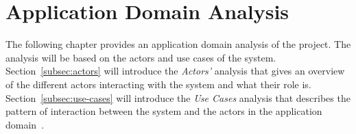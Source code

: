 \section{Application Domain Analysis}\label{sec:application-domain-analysis}

The following chapter provides an application domain analysis of the project.
The analysis will be based on the actors and use cases of the system.
Section~\ref{subsec:actors} will introduce the \textit{Actors'} analysis that gives an overview of the different actors
interacting with the system and what their role is.
Section~\ref{subsec:use-cases} will introduce the \textit{Use Cases} analysis that describes the pattern of interaction
between the system and the actors in the application domain~\cite{mathiassen2018}.
\pagebreak




